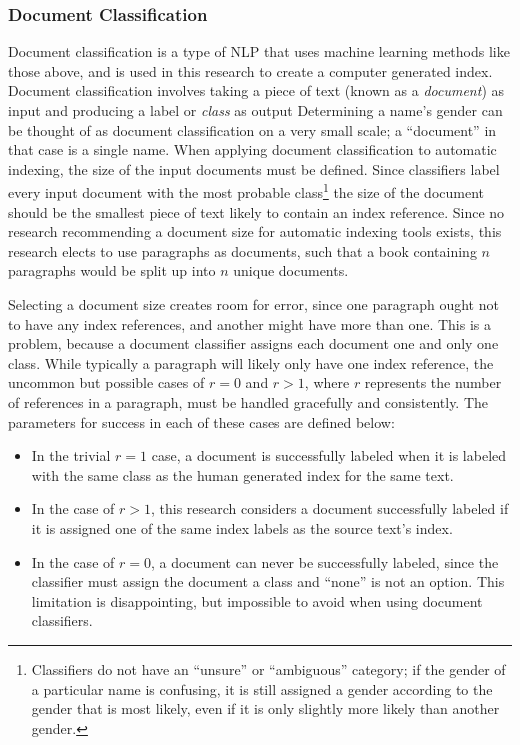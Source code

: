 \subsubsection{Document Classification}
Document classification is a type of NLP that uses machine learning methods like those above, and is used in this research to create a computer generated index.
Document classification involves taking a piece of text (known as a {\it document}) as input and producing a label or {\it class} as output\cite{jurafsky}%
Determining a name's gender can be thought of as document classification on a very small scale; a ``document'' in that case is a single name.
When applying document classification to automatic indexing, the size of the input documents must be defined.
Since classifiers label every input document with the most probable class\footnote{Classifiers do not have an ``unsure'' or ``ambiguous'' category; if the gender of a particular name is confusing, it is still assigned a gender according to the gender that is most likely, even if it is only slightly more likely than another gender.} the size of the document should be the smallest piece of text likely to contain an index reference.
Since no research recommending a document size for automatic indexing tools exists, this research elects to use paragraphs as documents, such that a book containing $n$ paragraphs would be split up into $n$ unique documents.

Selecting a document size creates room for error, since one paragraph ought not to have any index references, and another might have more than one.
This is a problem, because a document classifier assigns each document one and only one class.
While typically a paragraph will likely only have one index reference, the uncommon but possible cases of $r = 0$ and $r > 1$, where $r$ represents the number of references in a paragraph, must be handled gracefully and consistently.
The parameters for success in each of these cases are defined below:

\begin{itemize}
\item In the trivial $r = 1$ case, a document is successfully labeled when it is labeled with the same class as the human generated index for the same text.
\item In the case of $r > 1$, this research considers a document successfully labeled if it is assigned one of the same index labels as the source text's index.
\item In the case of $r = 0$, a document can never be successfully labeled, since the classifier must assign the document a class and ``none'' is not an option. This limitation is disappointing, but impossible to avoid when using document classifiers.
\end{itemize}

